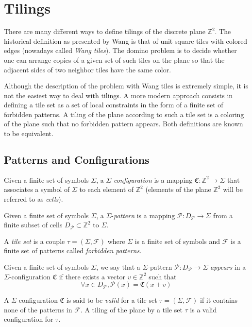 \documentclass{jac}
\newcommand{\ZZ}{\mathbb{Z}}
\newcommand{\C}{\mathfrak{C}}
\newcommand{\PP}{\mathcal{P}}
\newcommand{\F}{\mathcal{F}}
\begin{document}
\section{Tilings} \label{sec:tilings}

There are many different ways to define tilings of the discrete plane $\ZZ^2$. The historical definition as presented by Wang is that of unit square tiles with colored edges (nowadays called \emph{Wang tiles}). The domino problem is to decide whether one can arrange copies of a given set of such tiles on the plane so that the adjacent sides of two neighbor tiles have the same color.

Although the description of the problem with Wang tiles is extremely simple, it is not the easiest  way to deal with tilings. A more modern approach consists in defining a tile set as a set of local constraints in the form of a finite set of forbidden patterns. A tiling of the plane according to such a tile set is a coloring of the plane such that no forbidden pattern appears. Both definitions are known to be equivalent.

\subsection{Patterns and Configurations}

\begin{definition}[Configuration]\label{def:configuration}
	Given a finite set of symbols $\Sigma$, a $\Sigma$-\emph{configuration} is a mapping $\C:\ZZ^2\rightarrow \Sigma$ that associates a symbol of $\Sigma$ to each element of $\ZZ^2$ (elements of the plane $\ZZ^2$ will be referred to as \emph{cells}).
\end{definition}

\begin{definition}[Pattern]\label{def:pattern}
	Given a finite set of symbols $\Sigma$, a $\Sigma$-\emph{pattern} is a mapping $\PP: D_\PP \rightarrow \Sigma$ from a finite subset of cells $D_\PP\subset \ZZ^2$ to $\Sigma$.
\end{definition}

\begin{definition}\label{def:tile_set}
	A \emph{tile set} is a couple $\tau=(\Sigma, \F)$ where $\Sigma$ is a finite set of symbols and $\F$ is a finite set of patterns called \emph{forbidden patterns}.
\end{definition}

\begin{definition}[Tilings]\label{def:valid}
	Given a finite set of symbols $\Sigma$, we say that a $\Sigma$-pattern $\PP:D_\PP\rightarrow \Sigma$ \emph{appears} in a $\Sigma$-configuration $\C$ if there exists a vector $v\in\ZZ^2$ such that
	\[
	\forall x \in D_\PP, \PP(x) = \C(x+v)
	\]
	
	 A $\Sigma$-configuration $\C$ is said to be \emph{valid} for a tile set $\tau=(\Sigma, \F)$ if it contains none of the patterns in $\F$. A tiling of the plane by a tile set $\tau$ is a valid configuration for $\tau$.
\end{definition}
\end{document}
